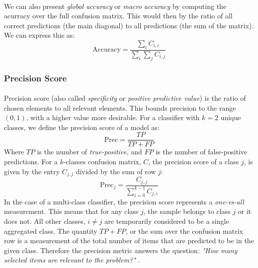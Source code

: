\documentclass[12pt,letterpaper]{article}
\begin{document}
\paragraph*{}We can also present \textit{global accuracy} or \textit{macro accuracy} by computing the acurracy over the full confusion matrix. This would then by the ratio of all correct predictions (the main diagonal) to all predictions (the sum of the matrix). We can express this as:
\begin{equation}
\text{Accuracy} = \frac{\sum_{i}C_{i,i}}{\sum_{i}\sum_{j}C_{i,j}}
\end{equation}


\subsubsection{Precision Score}

\paragraph*{}Precision score (also called \textit{specificity} or \textit{positive predictive value}) is the ratio of chosen elements to all relevant elements. This bounds precision to the range $(0,1)$, with a higher value more desirable. For a classifier with $k = 2$ unique classes, we define the precision score of a model as:
\begin{equation}
\label{eqn-BinaryPrecision}
\text{Prec} = \frac{TP}{TP + FP}
\end{equation}
Where $TP$ is the number of \textit{true-positive}, and $FP$ is the number of false-positive predictions. For a $k$-classes confusion matrix, $C$, the precision score of a class $j$, is given by the entry $C_{j,j}$ divided by the sum of row $j$:
\begin{equation}
\label{eqn-KPrecision}
\text{Prec}_j = \frac{C_{j,j}}{\sum_{i=0}^{k-1}C_{j,i}}
\end{equation}
In the case of a multi-class classifier, the precision score represents a \textit{one-vs-all} measurement. This means that for any class $j$, the sample belongs to class $j$ or it does not. All other classes, $i \neq j$ are temporarily considered to be a single aggregated class. The quantity $TP + FP$, or the sum over the confusion matrix row is a measurement of the total number of items that are predicted to be in the given class. Therefore the precision metric answers the question: \textit{"How many selected items are relevant to the problem?"} \cite{Geron,James}.
\end{document}

